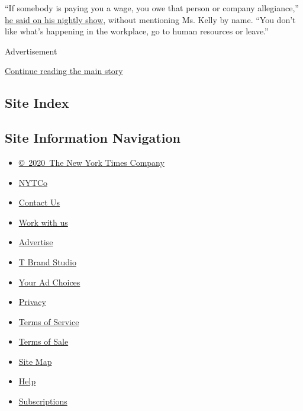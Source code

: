 ``If somebody is paying you a wage, you owe that person or company
allegiance,'' \href{https://www.youtube.com/watch?v=w8qvTIAiax0}{he said
on his nightly show}, without mentioning Ms. Kelly by name. ``You don't
like what's happening in the workplace, go to human resources or
leave.''

Advertisement

\protect\hyperlink{after-bottom}{Continue reading the main story}

\hypertarget{site-index}{%
\subsection{Site Index}\label{site-index}}

\hypertarget{site-information-navigation}{%
\subsection{Site Information
Navigation}\label{site-information-navigation}}

\begin{itemize}
\tightlist
\item
  \href{https://help.nytimes3xbfgragh.onion/hc/en-us/articles/115014792127-Copyright-notice}{©~2020~The
  New York Times Company}
\end{itemize}

\begin{itemize}
\tightlist
\item
  \href{https://www.nytco.com/}{NYTCo}
\item
  \href{https://help.nytimes3xbfgragh.onion/hc/en-us/articles/115015385887-Contact-Us}{Contact
  Us}
\item
  \href{https://www.nytco.com/careers/}{Work with us}
\item
  \href{https://nytmediakit.com/}{Advertise}
\item
  \href{http://www.tbrandstudio.com/}{T Brand Studio}
\item
  \href{https://www.nytimes3xbfgragh.onion/privacy/cookie-policy\#how-do-i-manage-trackers}{Your
  Ad Choices}
\item
  \href{https://www.nytimes3xbfgragh.onion/privacy}{Privacy}
\item
  \href{https://help.nytimes3xbfgragh.onion/hc/en-us/articles/115014893428-Terms-of-service}{Terms
  of Service}
\item
  \href{https://help.nytimes3xbfgragh.onion/hc/en-us/articles/115014893968-Terms-of-sale}{Terms
  of Sale}
\item
  \href{https://spiderbites.nytimes3xbfgragh.onion}{Site Map}
\item
  \href{https://help.nytimes3xbfgragh.onion/hc/en-us}{Help}
\item
  \href{https://www.nytimes3xbfgragh.onion/subscription?campaignId=37WXW}{Subscriptions}
\end{itemize}
